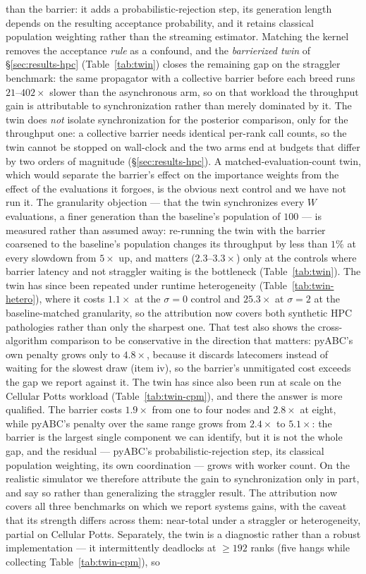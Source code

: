 than the barrier: it adds a probabilistic-rejection step, its generation length depends on the resulting acceptance probability, and it retains classical population weighting rather than the streaming estimator. Matching the kernel removes the acceptance \emph{rule} as a confound, and the \emph{barrierized twin} of \S\ref{sec:results-hpc} (Table~\ref{tab:twin}) closes the remaining gap on the straggler benchmark: the same propagator with a collective barrier before each breed runs $21$--$402\times$ slower than the asynchronous arm, so on that workload the throughput gain is attributable to synchronization rather than merely dominated by it. The twin does \emph{not} isolate synchronization for the posterior comparison, only for the throughput one: a collective barrier needs identical per-rank call counts, so the twin cannot be stopped on wall-clock and the two arms end at budgets that differ by two orders of magnitude (\S\ref{sec:results-hpc}). A matched-evaluation-count twin, which would separate the barrier's effect on the importance weights from the effect of the evaluations it forgoes, is the obvious next control and we have not run it. The granularity objection --- that the twin synchronizes every $W$ evaluations, a finer generation than the baseline's population of $100$ --- is measured rather than assumed away: re-running the twin with the barrier coarsened to the baseline's population changes its throughput by less than $1\%$ at every slowdown from $5\times$ up, and matters ($2.3$--$3.3\times$) only at the controls where barrier latency and not straggler waiting is the bottleneck (Table~\ref{tab:twin}). The twin has since been repeated under runtime heterogeneity (Table~\ref{tab:twin-hetero}), where it costs $1.1\times$ at the $\sigma{=}0$ control and $25.3\times$ at $\sigma{=}2$ at the baseline-matched granularity, so the attribution now covers both synthetic HPC pathologies rather than only the sharpest one. That test also shows the cross-algorithm comparison to be conservative in the direction that matters: pyABC's own penalty grows only to $4.8\times$, because it discards latecomers instead of waiting for the slowest draw (item iv), so the barrier's unmitigated cost exceeds the gap we report against it. The twin has since also been run at scale on the Cellular Potts workload (Table~\ref{tab:twin-cpm}), and there the answer is more qualified. The barrier costs $1.9\times$ from one to four nodes and $2.8\times$ at eight, while pyABC's penalty over the same range grows from $2.4\times$ to $5.1\times$: the barrier is the largest single component we can identify, but it is not the whole gap, and the residual --- pyABC's probabilistic-rejection step, its classical population weighting, its own coordination --- grows with worker count. On the realistic simulator we therefore attribute the gain to synchronization only in part, and say so rather than generalizing the straggler result. The attribution now covers all three benchmarks on which we report systems gains, with the caveat that its strength differs across them: near-total under a straggler or heterogeneity, partial on Cellular Potts. Separately, the twin is a diagnostic rather than a robust implementation --- it intermittently deadlocks at $\ge192$ ranks (five hangs while collecting Table~\ref{tab:twin-cpm}), so 